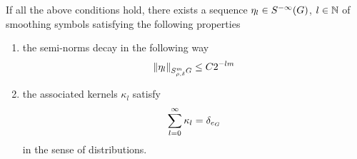 \begin{theorem}
    If all the above conditions hold,
    there exists a sequence $\eta_l \in \SmoothingSymbols$, $l \in \N$ of smoothing symbols satisfying the following properties
    \begin{enumerate}
        \item the semi-norms decay in the following way
            \begin{align}
                \SymbolSemiNorm{m}{\rho, \delta}{\eta_l} \leq C 2^{-lm}
            \end{align}
        \item the associated kernels $\kappa_l$ satisfy
            \begin{align*}
                \sum_{l = 0}^\infty \kappa_l = \DiracDelta{e_\Group}
            \end{align*}
            in the sense of distributions.
    \end{enumerate}
\end{theorem}
